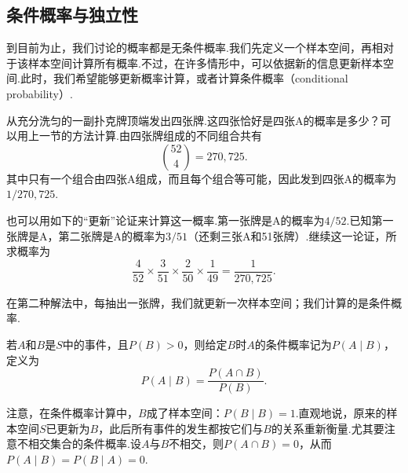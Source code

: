 \subsection{条件概率与独立性}\label{sec:1.3}
到目前为止，我们讨论的概率都是无条件概率.我们先定义一个样本空间，再相对于该样本空间计算所有概率.不过，在许多情形中，可以依据新的信息更新样本空间.此时，我们希望能够更新概率计算，或者计算条件概率（conditional probability）.

\begin{example}[四张A]\label{ex:1.3.1}
从充分洗匀的一副扑克牌顶端发出四张牌.这四张恰好是四张A的概率是多少？可以用上一节的方法计算.由四张牌组成的不同组合共有
$$\binom{52}{4}=270,725.$$
其中只有一个组合由四张A组成，而且每个组合等可能，因此发到四张A的概率为$1/270,725$.

也可以用如下的“更新”论证来计算这一概率.第一张牌是A的概率为$4/52$.已知第一张牌是A，第二张牌是A的概率为$3/51$（还剩三张A和51张牌）.继续这一论证，所求概率为
$$\frac4{52}\times\frac3{51}\times\frac2{50}\times\frac1{49}=\frac1{270,725}.$$
\end{example}

在第二种解法中，每抽出一张牌，我们就更新一次样本空间；我们计算的是条件概率.


\begin{definition}\label{def:1.3.2}
若$A$和$B$是$S$中的事件，且$P(B)>0$，则给定$B$时$A$的条件概率记为$P(A\mid B)$，定义为
\begin{equation}\label{eq:1.3.1}
P(A\mid B)=\frac{P(A\cap B)}{P(B)}.
\end{equation}
\end{definition}

注意，在条件概率计算中，$B$成了样本空间：$P(B\mid B)=1$.直观地说，原来的样本空间$S$已更新为$B$，此后所有事件的发生都按它们与$B$的关系重新衡量.尤其要注意不相交集合的条件概率.设$A$与$B$不相交，则$P(A\cap B)=0$，从而$P(A\mid B)=P(B\mid A)=0$.

